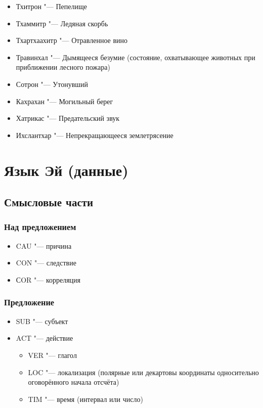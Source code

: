\begin{itemize}
\item Тхитрон "--- Пепелище
\item Тхаммитр "--- Ледяная скорбь
\item Тхартхаахитр "--- Отравленное вино
\item Травинхал "--- Дымящееся безумие (состояние, охватывающее животных при приближении лесного пожара)
\item Сотрон "--- Утонувший
\item Кахрахан "--- Могильный берег
\item Хатрикас "--- Предательский звук
\item Ихслантхар "--- Непрекращающееся землетрясение
\end{itemize}

\section{Язык Эй (данные)}

\subsection{Смысловые части}

\subsubsection{Над предложением}

\begin{itemize}
\item CAU "--- причина
\item CON "--- следствие
\item СOR "--- корреляция
\end{itemize}

\subsubsection{Предложение}

\begin{itemize}
\item SUB "--- субъект
\item ACT "--- действие
\begin{itemize}
\item VER "--- глагол
\item LOC "--- локализация (полярные или декартовы координаты односительно оговорённого начала отсчёта)
\item TIM "--- время (интервал или число)
\end{itemize}
\end{itemize}

